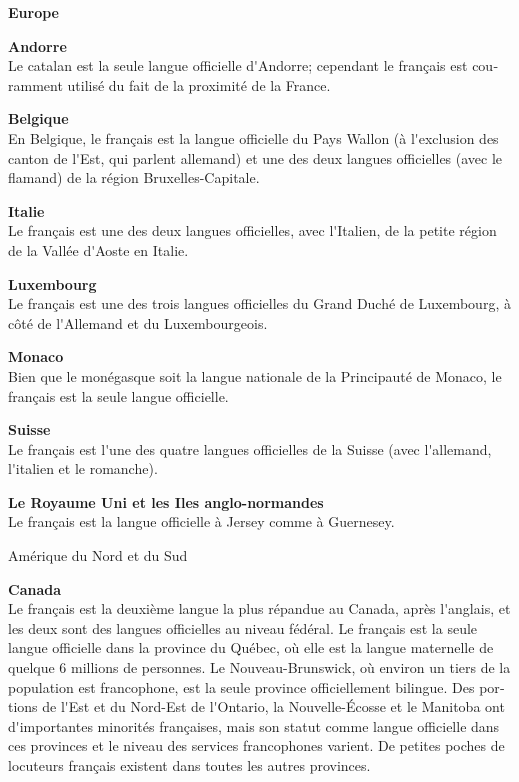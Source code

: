 \documentclass[]{../metanetpaper}
\begin{document}
\begin{french}
\begin{multicols}{2}
\begin{center}
{\bf {\sc Europe}}
\end{center}

{\bf Andorre}\\
Le catalan est la seule langue officielle d{\mbox '}Andorre; cependant
le français est couramment utilisé du fait de la proximité de la
France.

{\bf Belgique}\\
En Belgique, le français est la langue officielle du Pays Wallon (à
l{\mbox '}exclusion des canton de l{\mbox '}Est, qui parlent allemand)
et une des deux langues officielles (avec le flamand) de la région
Bruxelles-Capitale.

{\bf Italie}\\
Le français est une des deux langues officielles, avec l{\mbox
 '}Italien, de la petite région de la Vallée d{\mbox '}Aoste en
Italie.

{\bf Luxembourg}\\
Le français est une des trois langues officielles du Grand Duché de
Luxembourg, à côté de l{\mbox '}Allemand et du Luxembourgeois.

{\bf Monaco}\\ 
Bien que le monégasque soit la langue nationale de la Principauté de
Monaco, le français est la seule langue officielle.

{\bf Suisse}\\
Le français est l{\mbox '}une des quatre langues officielles de la
Suisse (avec l{\mbox '}allemand, l{\mbox '}italien et le romanche).

{\bf Le Royaume Uni et les Iles  anglo-normandes}\\
Le français est la langue officielle à Jersey comme à Guernesey.

\begin{center}
{\sc Amérique du Nord et du Sud}
\end{center}

{\bf Canada}\\
Le français est la deuxième langue la plus répandue au Canada, après
l{\mbox '}anglais, et les deux sont des langues officielles au niveau
fédéral. Le français est la seule langue officielle dans la province
du Québec, où elle est la langue maternelle de quelque 6 millions de
personnes. Le Nouveau-Brunswick, où environ un tiers de la population
est francophone, est la seule province officiellement bilingue. Des
portions de l{\mbox '}Est et du Nord-Est de l{\mbox '}Ontario, la
Nouvelle-Écosse et le Manitoba ont d{\mbox '}importantes minorités françaises,
mais son statut comme langue officielle dans ces provinces et le
niveau des services francophones varient. De petites poches de
locuteurs français existent dans toutes les autres provinces.


\end{multicols}
\end{french}
\end{document}
